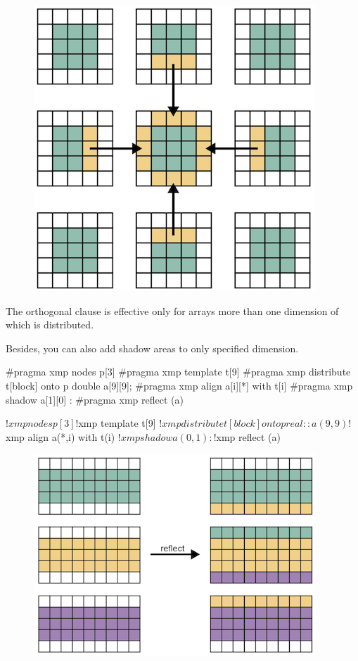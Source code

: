 
\begin{figure}
  \centering
  \includegraphics{figs/multi_orthogonal.png}
\end{figure}

\begin{mynote}
The orthogonal clause is effective only for arrays
more than one 
dimension of which is distributed.
\end{mynote}

Besides, you can also add shadow areas to only specified dimension.

\begin{XCexample}
#pragma xmp nodes p[3]
#pragma xmp template t[9]
#pragma xmp distribute t[block] onto p
double a[9][9];
#pragma xmp align a[i][*] with t[i]
#pragma xmp shadow a[1][0]
  :
#pragma xmp reflect (a)
\end{XCexample}

\begin{XFexample}
!$xmp nodes p[3]
!$xmp template t[9]
!$xmp distribute t[block] onto p
real :: a(9,9)
!$xmp align a(*,i) with t(i)
!$xmp shadow a(0,1)
  :
!$xmp reflect (a)
\end{XFexample}

\begin{figure}
  \centering
  \includegraphics{figs/1of2.png}
\end{figure}

